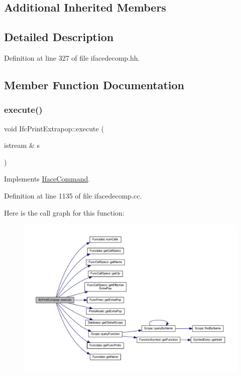 \subsection*{Additional Inherited Members}


\subsection{Detailed Description}


Definition at line 327 of file ifacedecomp.\+hh.



\subsection{Member Function Documentation}
\mbox{\label{class_ifc_print_extrapop_a57b328ffae6e3282b8cf789b702ba496}} 
\subsubsection{\texorpdfstring{execute()}{execute()}}
{\footnotesize\ttfamily void Ifc\+Print\+Extrapop\+::execute (\begin{DoxyParamCaption}\item[{istream \&}]{s }\end{DoxyParamCaption})\hspace{0.3cm}{\ttfamily [virtual]}}



Implements \mbox{\hyperlink{class_iface_command_af10e29cee2c8e419de6efe9e680ad201}{Iface\+Command}}.



Definition at line 1135 of file ifacedecomp.\+cc.

Here is the call graph for this function\+:
\nopagebreak
\begin{figure}[H]
\begin{center}
\leavevmode
\includegraphics[width=350pt]{class_ifc_print_extrapop_a57b328ffae6e3282b8cf789b702ba496_cgraph}
\end{center}
\end{figure}


